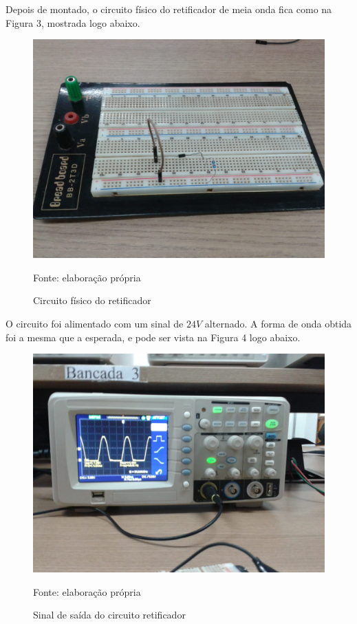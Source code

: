 \documentclass[
	12pt,				%
	openright,			%
	twoside,			%
	a4paper,			%
	article,	
	english,			%
	french,				%
	spanish,			%
	brazil				%
	]{abntex2}
\begin{document}
\par Depois de montado, o circuito físico do retificador de meia onda fica como na Figura 3, mostrada logo abaixo.

\begin{figure}[H]\centering
\caption{Circuito físico do retificador}
\includegraphics[scale=0.3]{circuitomontado.jpeg}

Fonte: elaboração própria
\end{figure}

\par O circuito foi alimentado com um sinal de $24 V$ alternado. A forma de onda obtida foi a mesma que a esperada, e pode ser vista na Figura 4 logo abaixo.

\begin{figure}[H]\centering
\caption{Sinal de saída do circuito retificador}
\includegraphics[scale=0.8,trim=6.5cm 14cm 24cm 9.2cm,clip]{waveform1.jpeg}

Fonte: elaboração própria
\end{figure}
\end{document}
